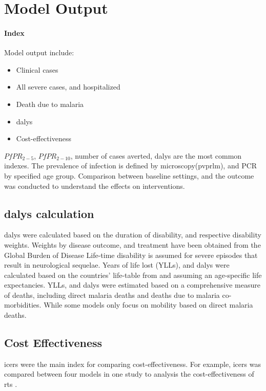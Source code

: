 \documentclass[a4paper, 12pt, twoside]{article}
\begin{document}
\section{Model Output}%
\label{sec:model_output}

\paragraph{Index}%
\label{par:index}
Model output include:
\begin{itemize}
	\item Clinical cases
	\item All severe cases, and hospitalized
	\item Death due to malaria
	\item \gls{dalys}
	\item Cost-effectiveness
\end{itemize}
$PfPR_{2-5}$, $PfPR_{2-10}$\cite{Penny2016}, number of cases averted, \gls{dalys} are the most common indexes.
The prevalence of infection is defined by microscopy(\gls{pvprlm}), and PCR by specified age group.
Comparison between baseline settings, and the outcome was conducted to understand the effects on interventions.

\subsection{\texorpdfstring{\gls{dalys} calculation}{DALYs Calculation}}%
\label{sub:dalys_calcualtion}
\gls{dalys} were calculated based on the duration of disability, and respective disability weights.
Weights by disease outcome, and treatment have been obtained from the Global Burden of Disease Life-time disability is assumed for severe episodes that result in neurological sequelae.
Years of life lost (YLLs), and \gls{dalys} were calculated based on the countries' life-table from and assuming an age-specific life expectancies. 
YLLs, and \gls{dalys} were estimated based on a comprehensive measure of deaths, including direct malaria deaths and deaths due to malaria co-morbidities.
While some models only focus on mobility based on direct malaria deaths.

\subsection{Cost Effectiveness}%
\label{sub:cost_effectiveness}
\gls{icers} were the main index for comparing cost-effectiveness.
For example, \gls{icers} was compared between four models in one study to analysis the cost-effectiveness of \gls{rts} \cite{Hay2004}.
\end{document}
